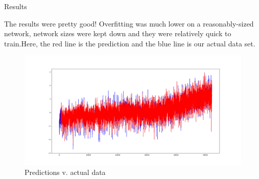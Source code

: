 \documentclass{beamer}
\begin{document}
\begin{frame}{Results}

  The results were pretty good! Overfitting was much lower on a
  reasonably-sized network, network sizes were kept down and they were
  relatively quick to train.\pause Here, the red line is the prediction and the
  blue line is our actual data set.

  \begin{center}
    \begin{figure}
      \includegraphics[scale=0.17]{accurate_predictions.png}
      \caption{Predictions v. actual data}
    \end{figure}
  \end{center}

\end{frame}
\end{document}
